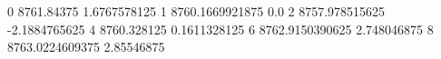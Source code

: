 0 8761.84375 1.6767578125
1 8760.1669921875 0.0
2 8757.978515625 -2.1884765625
4 8760.328125 0.1611328125
6 8762.9150390625 2.748046875
8 8763.0224609375 2.85546875
